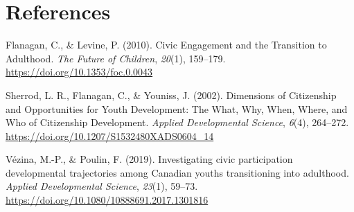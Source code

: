 \documentclass[
  man,
  floatsintext,
  longtable,
  nolmodern,
  notxfonts,
  notimes,
  colorlinks=true,linkcolor=blue,citecolor=blue,urlcolor=blue]{apa7}
\newlength{\cslhangindent}
\newenvironment{CSLReferences}[2] %
 {\begin{list}{}{%
  \setlength{\itemindent}{0pt}
  \setlength{\leftmargin}{0pt}
  \setlength{\parsep}{0pt}
  \ifodd #1
   \setlength{\leftmargin}{\cslhangindent}
   \setlength{\itemindent}{-1\cslhangindent}
  \fi
  \setlength{\itemsep}{#2\baselineskip}}}
 {\end{list}}
\begin{document}
\clearpage

\section{References}\label{references}

\label{refs}
\begin{CSLReferences}{1}{0}
Flanagan, C., \& Levine, P. (2010). Civic {Engagement} and the
{Transition} to {Adulthood}. \emph{The Future of Children},
\emph{20}(1), 159--179. \url{https://doi.org/10.1353/foc.0.0043}

Sherrod, L. R., Flanagan, C., \& Youniss, J. (2002). Dimensions of
{Citizenship} and {Opportunities} for {Youth Development}: {The What},
{Why}, {When}, {Where}, and {Who} of {Citizenship Development}.
\emph{Applied Developmental Science}, \emph{6}(4), 264--272.
\url{https://doi.org/10.1207/S1532480XADS0604_14}

Vézina, M.-P., \& Poulin, F. (2019). Investigating civic participation
developmental trajectories among {Canadian} youths transitioning into
adulthood. \emph{Applied Developmental Science}, \emph{23}(1), 59--73.
\url{https://doi.org/10.1080/10888691.2017.1301816}

\end{CSLReferences}
\end{document}
